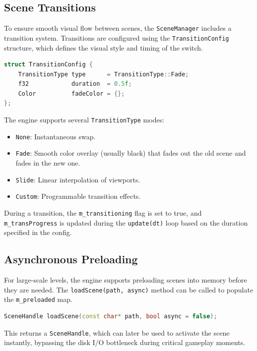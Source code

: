 \subsection{Scene Transitions}

To ensure smooth visual flow between scenes, the \texttt{SceneManager} includes a transition system. Transitions are configured using the \texttt{TransitionConfig} structure, which defines the visual style and timing of the switch.

\begin{lstlisting}[language=C++]
struct TransitionConfig {
    TransitionType type      = TransitionType::Fade;
    f32            duration  = 0.5f;
    Color          fadeColor = {};
};
\end{lstlisting}

The engine supports several \texttt{TransitionType} modes:
\begin{itemize}
    \item \texttt{None}: Instantaneous swap.
    \item \texttt{Fade}: Smooth color overlay (usually black) that fades out the old scene and fades in the new one.
    \item \texttt{Slide}: Linear interpolation of viewports.
    \item \texttt{Custom}: Programmable transition effects.
\end{itemize}

During a transition, the \texttt{m\_transitioning} flag is set to true, and \texttt{m\_transProgress} is updated during the \texttt{update(dt)} loop based on the duration specified in the config.

\subsection{Asynchronous Preloading}

For large-scale levels, the engine supports preloading scenes into memory before they are needed. The \texttt{loadScene(path, async)} method can be called to populate the \texttt{m\_preloaded} map.

\begin{lstlisting}[language=C++]
SceneHandle loadScene(const char* path, bool async = false);
\end{lstlisting}

This returns a \texttt{SceneHandle}, which can later be used to activate the scene instantly, bypassing the disk I/O bottleneck during critical gameplay moments.

